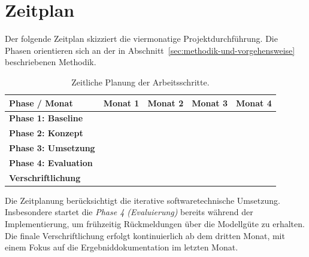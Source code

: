 


\section{Zeitplan}
\label{sec:zeitplan}

Der folgende Zeitplan skizziert die viermonatige Projektdurchführung.
Die Phasen orientieren sich an der in Abschnitt~\ref{sec:methodik-und-vorgehensweise} beschriebenen Methodik.

\begin{table}[h]
    \centering
    \renewcommand{\arraystretch}{1.5}
    \begin{tabularx}{\textwidth}{|l|X|X|X|X|}
        \hline
        \rowcolor[gray]{0.9} \textbf{Phase / Monat} & \textbf{Monat 1} & \textbf{ Monat 2} & \textbf{ Monat 3} & \textbf{ Monat 4} \\ \hline
        \textbf{Phase 1: Baseline} & \cellcolor{blue! 30} & & & \\ \hline
        \textbf{Phase 2: Konzept} & & \cellcolor{blue! 30} & & \\ \hline
        \textbf{Phase 3: Umsetzung} & & \cellcolor{blue!30} & \cellcolor{blue!30} & \\ \hline
        \textbf{Phase 4: Evaluation} & & & \cellcolor{blue!30} & \cellcolor{blue!30} \\ \hline
        \textbf{Verschriftlichung} & & & \cellcolor{red!20} & \cellcolor{red!20} \\ \hline
    \end{tabularx}
    \caption{Zeitliche Planung der Arbeitsschritte.\protect\footnotemark}\label{tab:table}
\end{table}


\noindent
Die Zeitplanung berücksichtigt die iterative softwaretechnische Umsetzung.
Insbesondere startet die \textit{Phase 4 (Evaluierung)} bereits während der Implementierung, um frühzeitig Rückmeldungen über die Modellgüte zu erhalten.
Die finale Verschriftlichung erfolgt kontinuierlich ab dem dritten Monat, mit einem Fokus auf die Ergebniddokumentation im letzten Monat.
